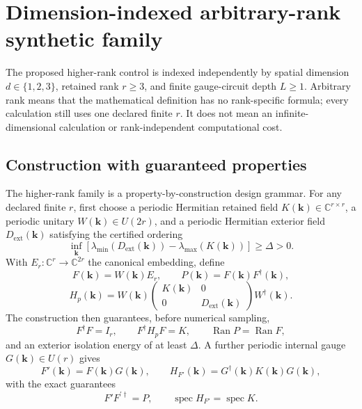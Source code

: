 \documentclass[11pt]{article}
\newenvironment{prospective}{\color{prospectivered}}{}
\begin{document}
\begin{prospective}
\section{Dimension-indexed arbitrary-rank synthetic family}
The proposed higher-rank control is indexed independently by spatial dimension
$d\in\{1,2,3\}$, retained rank $r\geq3$, and finite gauge-circuit depth $L\geq1$.
Arbitrary rank means that the mathematical definition has no rank-specific formula;
every calculation still uses one declared finite $r$. It does not mean an
infinite-dimensional calculation or rank-independent computational cost.

\subsection{Construction with guaranteed properties}

The higher-rank family is a property-by-construction design grammar. For any declared
finite $r$, first choose a periodic Hermitian retained field
$K(\mathbf k)\in\mathbb C^{r\times r}$, a periodic unitary
$W(\mathbf k)\in U(2r)$, and a periodic Hermitian exterior field
$D_{\mathrm{ext}}(\mathbf k)$ satisfying the certified ordering
\begin{equation}
 \inf_{\mathbf k}\left[
 \lambda_{\min}(D_{\mathrm{ext}}(\mathbf k))
 -\lambda_{\max}(K(\mathbf k))\right]\geq\Delta>0.
 \label{eq:construction-gap}
\end{equation}
With $E_r:\mathbb C^r\to\mathbb C^{2r}$ the canonical embedding, define
\begin{equation}
 F(\mathbf k)=W(\mathbf k)E_r,
 \qquad
 P(\mathbf k)=F(\mathbf k)F^\dagger(\mathbf k),
 \label{eq:construction-frame}
\end{equation}
\begin{equation}
 H_p(\mathbf k)=W(\mathbf k)
 \begin{pmatrix}
 K(\mathbf k)&0\\
 0&D_{\mathrm{ext}}(\mathbf k)
 \end{pmatrix}
 W^\dagger(\mathbf k).
 \label{eq:construction-parent}
\end{equation}
The construction then guarantees, before numerical sampling,
\begin{equation}
 F^\dagger F=I_r,
 \qquad
 F^\dagger H_pF=K,
 \qquad
 \operatorname{Ran}P=\operatorname{Ran}F,
 \label{eq:construction-guarantees}
\end{equation}
and an exterior isolation energy of at least $\Delta$. A further periodic internal gauge
$G(\mathbf k)\in U(r)$ gives
\begin{equation}
 F'(\mathbf k)=F(\mathbf k)G(\mathbf k),
 \qquad
 H_{F'}(\mathbf k)=G^\dagger(\mathbf k)K(\mathbf k)G(\mathbf k),
 \label{eq:construction-internal-gauge}
\end{equation}
with the exact guarantees
\begin{equation}
 F'F^{\prime\dagger}=P,
 \qquad
 \operatorname{spec}H_{F'}=\operatorname{spec}K.
 \label{eq:construction-gauge-guarantees}
\end{equation}


\end{prospective}
\end{document}

